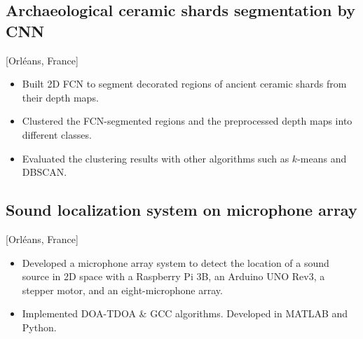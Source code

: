 \documentclass{mycv}
\begin{document}
\subsection{Archaeological ceramic shards segmentation by CNN}[Orl\'eans, France]
\begin{positions}
\end{positions}

\begin{itemize}
    \item Built 2D FCN to segment decorated regions of ancient ceramic shards from their depth maps.
    \item Clustered the FCN-segmented regions and the preprocessed depth maps into different classes.
    \item Evaluated the clustering results with other algorithms such as $k$-means and DBSCAN.
\end{itemize}



\subsection{Sound localization system on microphone array}[Orl\'eans, France]
\begin{positions}
\end{positions}

\begin{itemize}
  \item Developed a microphone array system to detect the location of a sound source in 2D space with a Raspberry Pi 3B, an Arduino UNO Rev3, a stepper motor, and an eight-microphone array.
  \item Implemented DOA-TDOA \& GCC algorithms. Developed in MATLAB and Python.
\end{itemize}
\end{document}
